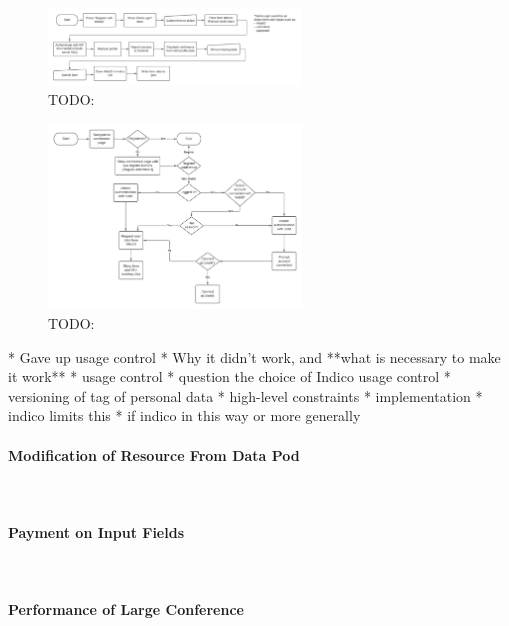 \begin{figure}
    \centering
    \includegraphics[width=0.6\textwidth]{prototype/graphs/poc-conference_registration_flow-server_side-sideways.jpeg}
    \caption{TODO:}
    \label{fig:poc-conference_registration_flow-server_side-sideways}
\end{figure}

\begin{figure}
    \centering
    \includegraphics[width=0.6\textwidth]{prototype/graphs/poc-conference_registration_flow-sideways.jpeg}
    \caption{TODO:}
    \label{fig:poc-conference_registration_flow-sideways}
\end{figure}

* Gave up usage control
  * Why it didn't work, and **what is necessary to make it work**
    * usage control
    * question the choice of Indico usage control
    * versioning of tag of personal data
* high-level constraints
* implementation
  * indico limits this
* if indico in this way or more generally

\paragraph{Modification of Resource From Data Pod}\mbox{}\\

\paragraph{Payment on Input Fields}\mbox{}\\

\paragraph{Performance of Large Conference}\mbox{}\\

